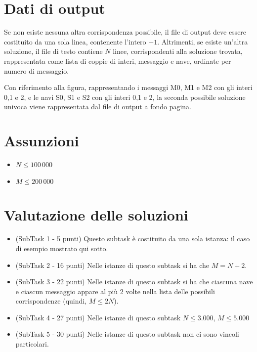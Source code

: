 \documentclass[a4paper,11pt]{article}
\begin{document}
\section*{Dati di output}
  
Se non esiste nessuna altra corrispondenza possibile, il file di output
deve essere costituito da una sola linea, contenente l'intero $-1$.
Altrimenti, se esiste un'altra soluzione, il file di testo contiene $N$
linee, corrispondenti alla soluzione trovata, rappresentata come lista
di coppie di interi, messaggio e nave, ordinate per numero di messaggio.

Con riferimento alla figura, rappresentando i messaggi M0, M1 e M2 con
gli interi 0,1 e 2, e  le navi S0, S1 e S2 con gli interi 0,1 e 2, la
seconda possibile soluzione univoca viene rappresentata dal file di
output a fondo pagina.
 
\section*{Assunzioni}

\begin{itemize}
  \item $N ≤ 100\,000$
  \item $M ≤ 200\,000$
\end{itemize}

\section*{Valutazione delle soluzioni}

\begin{itemize}
  \item  (SubTask 1 - 5 punti) Questo subtask è costituito da una sola istanza: il caso di esempio mostrato qui sotto.
  \item  (SubTask 2 - 16 punti) Nelle istanze di questo subtask si ha che $M=N+2$.
  \item  (SubTask 3 - 22 punti) Nelle istanze di questo subtask si ha che ciascuna nave e ciascun messaggio appare al più $2$ volte nella lista delle possibili corrispondenze (quindi, $M ≤ 2N$).
  \item (SubTask 4 - 27 punti) Nelle istanze di questo subtask $N ≤  3.000$, $M ≤  5.000$ 
  \item (SubTask 5 - 30 punti) Nelle istanze di questo subtask non ci sono vincoli particolari.
\end{itemize}
\end{document}
